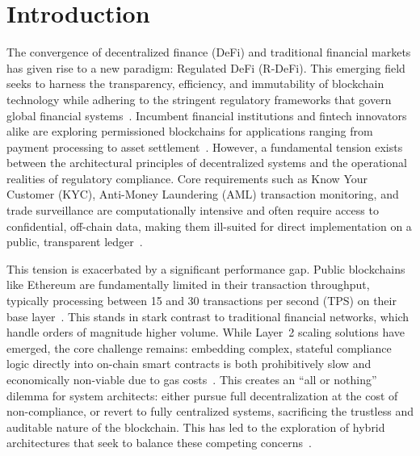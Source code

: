 \section{Introduction}
\label{sec:intro}

The convergence of decentralized finance (DeFi) and traditional financial markets has given rise to a new paradigm: Regulated DeFi (R-DeFi). This emerging field seeks to harness the transparency, efficiency, and immutability of blockchain technology while adhering to the stringent regulatory frameworks that govern global financial systems~\cite{mazzola2020rdefi}. Incumbent financial institutions and fintech innovators alike are exploring permissioned blockchains for applications ranging from payment processing to asset settlement~\cite{jamithireddy2025hybrid}. However, a fundamental tension exists between the architectural principles of decentralized systems and the operational realities of regulatory compliance. Core requirements such as Know Your Customer (KYC), Anti-Money Laundering (AML) transaction monitoring, and trade surveillance are computationally intensive and often require access to confidential, off-chain data, making them ill-suited for direct implementation on a public, transparent ledger~\cite{sak2024kyc,wolfsberg2025framework}.

This tension is exacerbated by a significant performance gap. Public blockchains like Ethereum are fundamentally limited in their transaction throughput, typically processing between 15 and 30 transactions per second (TPS) on their base layer~\cite{suissebank2025tps,astar2023layer2}. This stands in stark contrast to traditional financial networks, which handle orders of magnitude higher volume. While Layer~2 scaling solutions have emerged, the core challenge remains: embedding complex, stateful compliance logic directly into on-chain smart contracts is both prohibitively slow and economically non-viable due to gas costs~\cite{auer2024technology}. This creates an ``all or nothing'' dilemma for system architects: either pursue full decentralization at the cost of non-compliance, or revert to fully centralized systems, sacrificing the trustless and auditable nature of the blockchain. This has led to the exploration of hybrid architectures that seek to balance these competing concerns~\cite{chainlink2024hybrid}.

